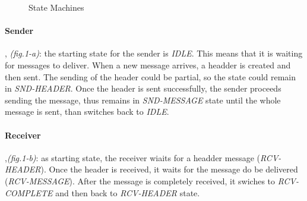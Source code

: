 \begin{figure}[ht!]
  \begin{center}
  \end{center}
  \caption{%
    State Machines
  }%
\end{figure}

\paragraph{Sender}, \textit{(fig.1-a)}:
the starting state for the sender is \textit{IDLE}. This means that it is waiting for
messages to deliver. When a new message arrives, a headder is created and then sent. The sending of the
header could be partial, so the state could remain in \textit{SND-HEADER}. Once the header is sent successfully,
the sender proceeds sending the message, thus remains in \textit{SND-MESSAGE} state until the whole message
is sent, than switches back to \textit{IDLE}.

\paragraph{Receiver},\textit{(fig.1-b)}:
as starting state, the receiver wiaits for a headder message (\textit{RCV-HEADER}).
Once the header is received, it waits for the message do be delivered (\textit{RCV-MESSAGE}). After the message
is completely received, it swiches to \textit{RCV-COMPLETE} and then back to \textit{RCV-HEADER} state.
